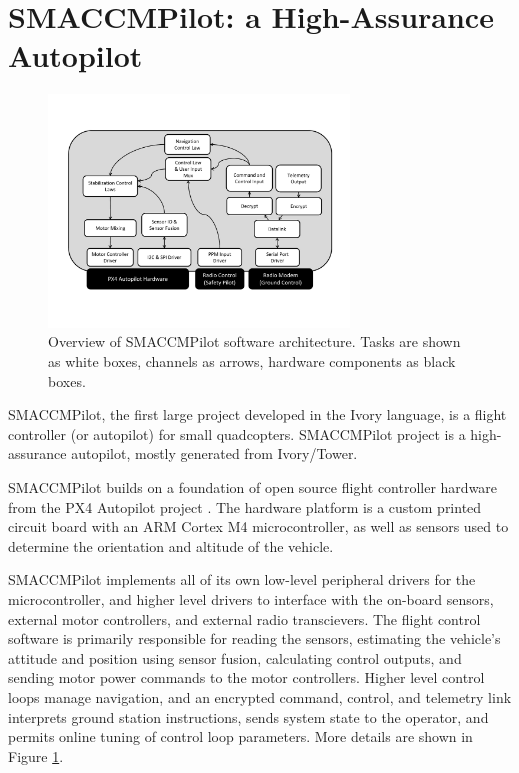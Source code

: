 \section{SMACCMPilot: a High-Assurance Autopilot}
\label{sec:smaccmpilot}

\begin{figure}[ht!]
  \begin{center}
\includegraphics[width=8cm]{figures/smaccmpilot-diagram-jan14}
  \end{center}
\caption[SMACCMPilot software architecture]{Overview of SMACCMPilot
software architecture. Tasks are shown as white boxes, channels as arrows,
hardware components as black boxes.}
\label{fig:smaccmpilotSwArch}
\end{figure}


SMACCMPilot, the first large project
developed in the Ivory language, is a flight controller (or autopilot) for small
quadcopters. SMACCMPilot project is a high-assurance autopilot, mostly generated
from Ivory/Tower.

SMACCMPilot builds on a foundation of open source flight controller hardware
from the PX4 Autopilot project . The hardware platform is a
custom printed circuit board with an ARM Cortex M4 microcontroller, as well as
sensors used to determine the orientation and altitude of the vehicle.

SMACCMPilot implements all of its own low-level peripheral drivers for the
microcontroller, and higher level drivers to interface with the on-board
sensors, external motor controllers, and external radio transcievers. The flight
control software is primarily responsible for reading the sensors, estimating
the vehicle's attitude and position using sensor fusion, calculating control
outputs, and sending motor power commands to the motor controllers.  Higher
level control loops manage navigation, and an encrypted command, control, and
telemetry link interprets ground station instructions, sends system state to the
operator, and permits online tuning of control loop parameters. More details are
shown in Figure \ref{fig:smaccmpilotSwArch}.

